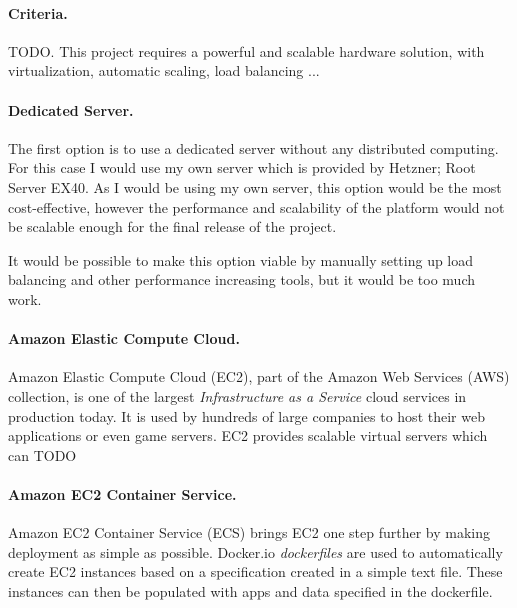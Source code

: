 \documentclass[a4paper, 12pt]{article}
\begin{document}
\paragraph{Criteria.}
TODO. This project requires a powerful and scalable hardware solution, with virtualization, automatic scaling, load balancing ...


\paragraph{Dedicated Server.}
The first option is to use a dedicated server without any distributed computing. For this case I would use my own server which is provided by Hetzner; Root Server EX40. As I would be using my own server, this option would be the most cost-effective, however the performance and scalability of the platform would not be scalable enough for the final release of the project.


It would be possible to make this option viable by manually setting up load balancing and other performance increasing tools, but it would be too much work.


\paragraph{Amazon Elastic Compute Cloud.}
Amazon Elastic Compute Cloud (EC2), part of the Amazon Web Services (AWS) collection, is one of the largest \emph{Infrastructure as a Service} cloud services in production today. It is used by hundreds of large companies to host their web applications or even game servers. EC2 provides scalable virtual servers which can TODO


\paragraph{Amazon EC2 Container Service.}
Amazon EC2 Container Service (ECS) brings EC2 one step further by making deployment as simple as possible. Docker.io \emph{dockerfiles} are used to automatically create EC2 instances based on a specification created in a simple text file. These instances can then be populated with apps and data specified in the dockerfile.
\end{document}
